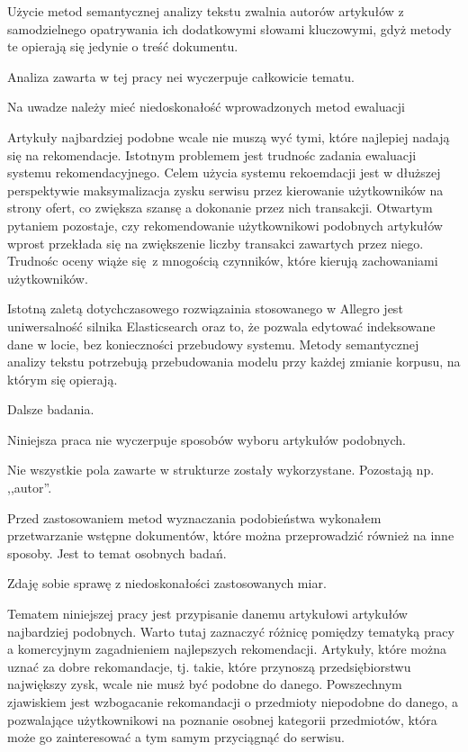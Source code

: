 \documentclass[pl]{minipw} %
\begin{document}
Użycie metod semantycznej analizy tekstu zwalnia autorów artykułów z samodzielnego opatrywania ich dodatkowymi słowami kluczowymi, gdyż metody te opierają się jedynie o treść dokumentu.

Analiza zawarta w tej pracy nei wyczerpuje całkowicie tematu. 

Na uwadze należy mieć niedoskonałość wprowadzonych metod ewaluacji

Artykuły najbardziej podobne wcale nie muszą wyć tymi, które najlepiej nadają się na rekomendacje. Istotnym problemem jest trudnośc zadania ewaluacji systemu rekomendacyjnego. Celem użycia systemu rekoemdacji jest w dłuższej perspektywie maksymalizacja zysku serwisu przez kierowanie użytkowników na strony ofert, co zwiększa szansę a dokonanie przez nich transakcji. Otwartym pytaniem pozostaje, czy rekomendowanie użytkownikowi podobnych artykułów wprost przekłada się na zwiększenie liczby transakci zawartych przez niego. Trudnośc oceny wiąże się z mnogością czynników, które kierują zachowaniami użytkowników.


Istotną zaletą dotychczasowego rozwiązainia stosowanego w Allegro jest uniwersalność silnika Elasticsearch oraz to, że pozwala edytować indeksowane dane w locie, bez konieczności przebudowy systemu. Metody semantycznej analizy tekstu potrzebują przebudowania modelu przy każdej zmianie korpusu, na którym się opierają. 


Dalsze badania.

Niniejsza praca nie wyczerpuje sposobów wyboru artykułów podobnych. 

Nie wszystkie pola zawarte w strukturze zostały wykorzystane. Pozostają np. ,,autor''.

Przed zastosowaniem metod wyznaczania podobieństwa wykonałem przetwarzanie wstępne dokumentów, które można przeprowadzić również na inne sposoby. Jest to temat osobnych badań.

Zdaję sobie sprawę z niedoskonałości zastosowanych miar.

Tematem niniejszej pracy jest przypisanie danemu artykułowi artykułów najbardziej podobnych. Warto tutaj zaznaczyć różnicę pomiędzy tematyką pracy a komercyjnym zagadnieniem najlepszych rekomendacji. Artykuły, które można uznać za dobre rekomandacje, tj. takie, które przynoszą przedsiębiorstwu największy zysk, wcale nie musż być podobne do danego. Powszechnym zjawiskiem jest wzbogacanie rekomandacji o przedmioty niepodobne do danego, a pozwalające użytkownikowi na poznanie osobnej kategorii przedmiotów, która może go zainteresować a tym samym przyciągnąć do serwisu.
\end{document}
